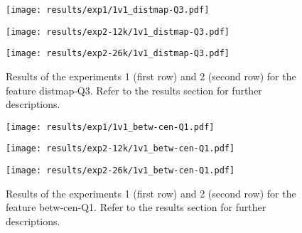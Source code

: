 \begin{figure}[h!]
    \centering
	\begin{minipage}{0.3\linewidth}
		\texttt{[image: results/exp1/1v1\_distmap-Q3.pdf]}
	\end{minipage}

	\begin{minipage}{0.3\linewidth}
		\texttt{[image: results/exp2-12k/1v1\_distmap-Q3.pdf]}
	\end{minipage}
	\begin{minipage}{0.3\linewidth}
		\texttt{[image: results/exp2-26k/1v1\_distmap-Q3.pdf]}
	\end{minipage}

	\caption[ Results: Feature distmap-Q3]{ Results of the experiments 1 (first row) and 2 (second row) for the feature distmap-Q3. Refer to the results section for further descriptions. }
	\label{fig:appendix_distmap-Q3}
\end{figure}
 \newpage 

 
\begin{figure}[h!]
    \centering
	\begin{minipage}{0.3\linewidth}
		\texttt{[image: results/exp1/1v1\_betw-cen-Q1.pdf]}
	\end{minipage}

	\begin{minipage}{0.3\linewidth}
		\texttt{[image: results/exp2-12k/1v1\_betw-cen-Q1.pdf]}
	\end{minipage}
	\begin{minipage}{0.3\linewidth}
		\texttt{[image: results/exp2-26k/1v1\_betw-cen-Q1.pdf]}
	\end{minipage}

	\caption[ Results: Feature betw-cen-Q1]{ Results of the experiments 1 (first row) and 2 (second row) for the feature betw-cen-Q1. Refer to the results section for further descriptions. }
	\label{fig:appendix_betw-cen-Q1}
\end{figure}
 
